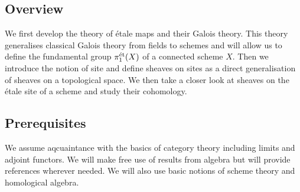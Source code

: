 \subsection{Overview}
We first develop the theory of \'etale maps and their Galois theory. This theory generalises classical Galois theory from fields to schemes and will allow us to define the fundamental group $\pi_1^{\text{\'et}}(X)$ of a connected scheme $X$. Then we introduce the notion of site and define sheaves on sites as a direct generalisation of sheaves on a topological space. We then take a closer look at sheaves on the \'etale site of a scheme and study their cohomology.

\subsection{Prerequisites}
We assume aqcuaintance with the basics of category theory including limits and adjoint functors. We will make free use of results from algebra but will provide references wherever needed. We will also use basic notions of scheme theory and homological algebra.

%
